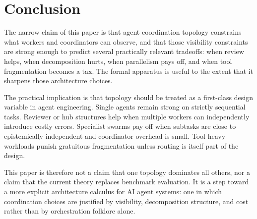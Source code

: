 \section{Conclusion}

The narrow claim of this paper is that agent coordination topology constrains what workers and
coordinators can observe, and that those visibility constraints are strong enough to predict several
practically relevant tradeoffs: when review helps, when decomposition hurts, when parallelism pays off,
and when tool fragmentation becomes a tax. The formal apparatus is useful to the extent that it sharpens
those architecture choices.

The practical implication is that topology should be treated as a first-class design variable in agent
engineering. Single agents remain strong on strictly sequential tasks. Reviewer or hub structures help
when multiple workers can independently introduce costly errors. Specialist swarms pay off when subtasks
are close to epistemically independent and coordinator overhead is small. Tool-heavy workloads punish
gratuitous fragmentation unless routing is itself part of the design.

This paper is therefore not a claim that one topology dominates all others, nor a claim that the current
theory replaces benchmark evaluation. It is a step toward a more explicit architecture calculus for AI
agent systems: one in which coordination choices are justified by visibility, decomposition structure, and
cost rather than by orchestration folklore alone.
